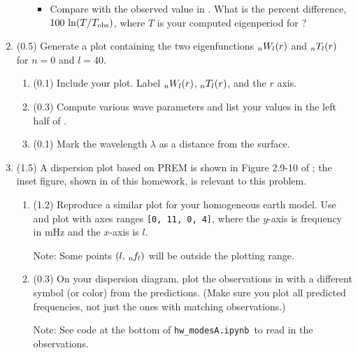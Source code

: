 \documentclass[11pt,titlepage,fleqn]{article}
\newcommand{\tfileA}{{\tt hw\_modesA.ipynb}}
\begin{document}
\begin{enumerate}
\begin{enumerate}
\begin{itemize}
\item Compare with the observed value in . What is the percent difference, $100\,\ln(T/T_{\rm obs})$, where $T$ is your computed eigenperiod for ?
\end{itemize}

\end{enumerate}

\label{prob:l29}


\item (0.5) Generate a plot containing the two eigenfunctions $\mbox{${}_nW_l$}(r)$ and $\mbox{${}_nT_l$}(r)$ for $n=0$ and $l=40$.
%
\begin{enumerate}
\item (0.1) Include your plot. Label $\mbox{${}_nW_l$}(r)$, $\mbox{${}_nT_l$}(r)$, and the $r$ axis.
\item (0.3) Compute various wave parameters and list your values in the left half of .
\item (0.1) Mark the wavelength $\lambda$ as a distance from the surface.
\end{enumerate}

\label{prob:0T40_homo}


\item (1.5) A dispersion plot based on PREM is shown in Figure 2.9-10 of \citet{SteinWysession}; the inset figure, shown in  of this homework, is relevant to this problem. 
%
\begin{enumerate}
\item (1.2) Reproduce a similar plot for your homogeneous earth model. Use  and plot with axes ranges \verb+[0, 11, 0, 4]+, where the $y$-axis is frequency in mHz and the $x$-axis is $l$.

Note: Some points $(l,\,\mbox{${}_{n\hspace{-0.2 mm}}f_l$})$ will be outside the plotting range.

\item (0.3) On your dispersion diagram, plot the observations in  with a different symbol (or color) from the predictions. (Make sure you plot all predicted frequencies, not just the ones with matching observations.)

Note: See code at the bottom of \tfileA\ to read in the observations.

\end{enumerate}

\label{prob:disp}



\end{enumerate}
\end{document}
